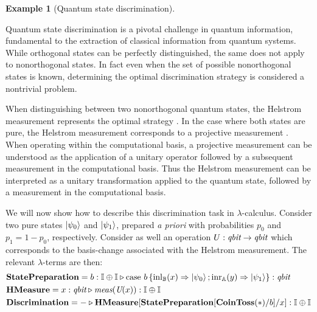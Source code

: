 \documentclass[10pt,a4paper]{amsart}
\theoremstyle{definition}
\theoremstyle{definition}
\newtheorem{example}[definition]{Example}
\theoremstyle{definition}
\theoremstyle{definition}
\theoremstyle{definition}
\theoremstyle{definition}
\begin{document}
\begin{example}[Quantum state discrimination] \label{ex:quantum_state_discrimination_syntax}

Quantum state discrimination is a pivotal challenge in quantum information,
fundamental to the extraction of classical information from quantum systems.
While orthogonal states can be perfectly distinguished, the same does not apply
to nonorthogonal states. In fact even when the set of possible nonorthogonal
states is known, determining the optimal discrimination strategy is considered
a nontrivial problem.

When distinguishing between two nonorthogonal quantum states, the Helstrom
measurement represents the optimal strategy
\cite{helstromQuantumDetectionEstimation1976}. In the case where both states
are pure, the Helstrom measurement corresponds to a projective measurement
\cite{barnett2009quantum}.  When operating within the computational basis, a
projective measurement can be understood as the application of a unitary
operator followed by a subsequent measurement in the computational basis. Thus
the Helstrom measurement can be interpreted as a unitary transformation applied
to the quantum state, followed by a measurement in the computational basis. 

We will now show how to describe this discrimination task in
$\lambda$-calculus.  Consider two pure states $\ket{\psi_0}$ and
$\ket{\psi_1}$, prepared \emph{a priori} with probabilities $p_0$ and $p_1 = 1-p_0$,
respectively. Consider as well an operation $U : \emph{qbit} \to \emph{qbit}$ which
corresponds to the basis-change associated with the Helstrom measurement.
The relevant $\lambda$-terms are then:
\begin{align*}
  &\textbf{StatePreparation} =  b: \mathbb{I} \oplus \mathbb{I}  \triangleright  \text{case } b\,
  \{\mathrm{inl}_{\mathbb{B}}(x) \Rightarrow \ket{\psi_0} ; \mathrm{inr}_{\mathbb{A}}(y) \Rightarrow \ket{\psi_1}\}: \textit{qbit} \\
  &\textbf{HMeasure} =  x : \emph{qbit} \triangleright \emph{meas} (\emph{U}(x)): \mathbb{I} \oplus \mathbb{I} \\
  &\textbf{Discrimination} = - \triangleright \textbf{HMeasure} [ \textbf{StatePreparation} [\textbf{CoinToss}(*)/ b] / x] : \mathbb{I}\oplus \mathbb{I}
\end{align*}
\end{example}
\end{document}

